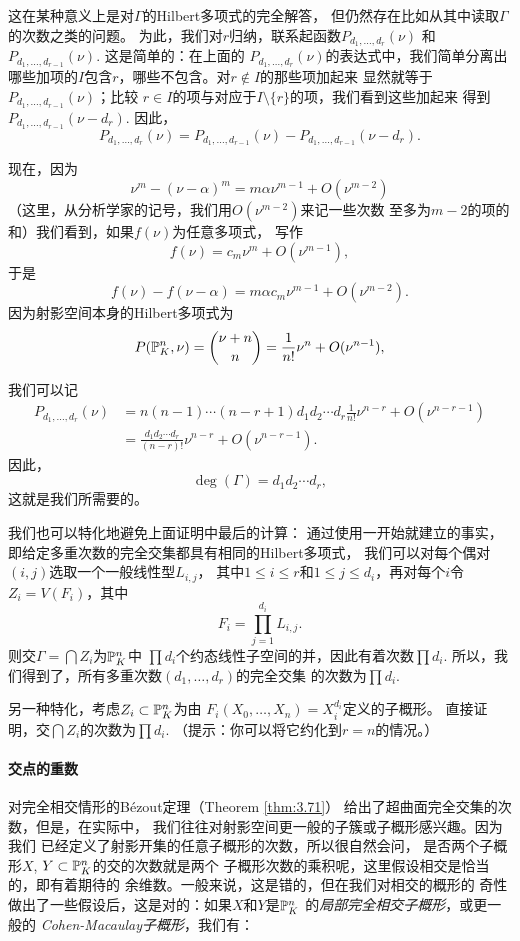这在某种意义上是对$\Gamma$的Hilbert多项式的完全解答，
但仍然存在比如从其中读取$\Gamma$的次数之类的问题。
为此，我们对$r$归纳，联系起函数$P_{d_1,\dots,d_r}(\nu)$
和$P_{d_1,\dots,d_{r-1}}(\nu)$. 这是简单的：在上面的
$P_{d_1,\dots,d_r}(\nu)$的表达式中，我们简单分离出
哪些加项的$I$包含$r$，哪些不包含。对$r\not\in I$的那些项加起来
显然就等于$P_{d_1,\dots,d_{r-1}}(\nu)$；比较
$r\in I$的项与对应于$I\setminus \{r\}$的项，我们看到这些加起来
得到$P_{d_1,\dots,d_{r-1}}(\nu-d_r)$. 因此，
\[
	P_{d_1,\dots,d_r}(\nu)=P_{d_1,\dots,d_{r-1}}(\nu)-
	P_{d_1,\dots,d_{r-1}}(\nu-d_r).
\]

现在，因为
\[
	\nu^m-(\nu-\alpha)^m=m\alpha\nu^{m-1}+O(\nu^{m-2})
\]
（这里，从分析学家的记号，我们用$O(\nu^{m-2})$来记一些次数
至多为$m-2$的项的和）我们看到，如果$f(\nu)$为任意多项式，
写作
\[
	f(\nu)=c_m\nu^m+O(\nu^{m-1}),
\]
于是
\[
	f(\nu)-f(\nu-\alpha)=m\alpha c_m\nu^{m-1}+O(\nu^{m-2}).
\]
因为射影空间本身的Hilbert多项式为
\[
	P(\P_K^n,\nu)=\binom{\nu+n}{n}=\frac{1}{n!}\nu^n+
	O(\nu^{n-1}),
\]


我们可以记
\begin{align*}
P_{d_1,\dots,d_r}(\nu)&=n(n-1)\cdots (n-r+1)d_1d_2\cdots
	d_r\frac 1{n!} \nu^{n-r}+O(\nu^{n-r-1})\\
&=\frac{d_1d_2\cdots d_r}{(n-r)!}\nu^{n-r}+O(\nu^{n-r-1}).
\end{align*}
因此，
\[
	\deg(\Gamma)=d_1d_2\cdots d_r,
\]
这就是我们所需要的。

我们也可以特化地避免上面证明中最后的计算：
通过使用一开始就建立的事实，
即给定多重次数的完全交集都具有相同的Hilbert多项式，
我们可以对每个偶对$(i,j)$选取一个一般线性型$L_{i,j}$，
其中$1\leq i\leq r$和$1\leq j\leq d_i$，再对每个$i$令
$Z_i=V(F_i)$，其中
\[
	F_i=\prod_{j=1}^{d_i}L_{i,j}.
\]
则交$\Gamma=\bigcap Z_i$为$\P_K^n$中
$\prod d_i$个约态线性子空间的并，因此有着次数$\prod d_i$.
所以，我们得到了，所有多重次数$(d_1,\dots,d_r)$的完全交集
的次数为$\prod d_i$.

\begin{exe}\label{exe:3.77}
另一种特化，考虑$Z_i\subset \P_K^n$为由
$F_i(X_0,\dots,X_n)=X_i^{d_i}$定义的子概形。
直接证明，交$\bigcap Z_i$的次数为$\prod d_i$. 
（提示：你可以将它约化到$r=n$的情况。）
\end{exe}

\paragraph*{交点的重数}
对完全相交情形的B\'ezout定理（Theorem \ref{thm:3.71}）
给出了超曲面完全交集的次数，但是，在实际中，
我们往往对射影空间更一般的子簇或子概形感兴趣。因为我们
已经定义了射影开集的任意子概形的次数，所以很自然会问，
是否两个子概形$X$, $Y\subset \P_K^n$的交的次数就是两个
子概形次数的乘积呢，这里假设相交是恰当的，即有着期待的
余维数。一般来说，这是错的，但在我们对相交的概形的
奇性做出了一些假设后，这是对的：如果$X$和$Y$是$\P_K^n$
的\textit{局部完全相交子概形}，或更一般的
\textit{Cohen-Macaulay子概形}，我们有：

